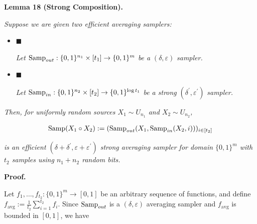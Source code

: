 \documentclass[10pt,a4paper]{article}
\begin{document}
\par\medskip\noindent\textbf{
\textbf{Lemma 18}\textbf{ }(Strong Composition)\textbf{.}
}\par



\emph{Suppose we are given two efficient averaging samplers:}\par


\begin{itemize}


\item[] 
$\blacksquare$ 


\emph{Let }$\textup{{Samp}}_{out}:\{0,1\}^{n_{1}}\times[t_{1}]\to\{0,1\}^{m}$\emph{ be a }$(\delta,\varepsilon)$\emph{ sampler.}\par





\item[] 
$\blacksquare$ 


\emph{Let }$\textup{{Samp}}_{in}:\{0,1\}^{n_{2}}\times[t_{2}]\to\{0,1\}^{\log t_{1}}$\emph{ be a strong }$(\delta^{\prime},\varepsilon^{\prime})$\emph{ sampler.}\par





\end{itemize}


\emph{Then, for uniformly random sources $X_{1}\sim U_{n_{1}}$ and $X_{2}\sim U_{n_{2}}$,}\par


\[\begin{gathered}
\textup{{Samp}}(X_{1}\circ X_{2}):=(\textup{{Samp}}_{out}(X_{1},\textup{{Samp}}_{in}(X_{2},i)))_{i\in[t_{2}]}
\end{gathered}\]


\emph{is an efficient $(\delta+\delta^{\prime},\varepsilon+\varepsilon^{\prime})$ strong averaging sampler for domain $\{0,1\}^{m}$ with $t_{2}$ samples using $n_{1}+n_{2}$ random bits.}\par






\par\medskip\noindent\textbf{Proof.}\par




Let $f_{1},\dots,f_{t_{2}}:\{0,1\}^{m}\to[0,1]$ be an arbitrary sequence of functions, and define $f_{\text{avg}}:=\frac{1}{t_{2}}\sum_{i=1}^{t_{2}}f_{i}$.
Since $\textup{{Samp}}_{out}$ is a $(\delta,\varepsilon)$ averaging sampler and $f_{\text{avg}}$ is bounded in $[0,1]$, we have\par
\end{document}
